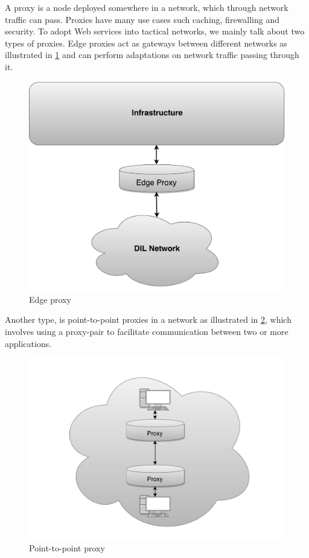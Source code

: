 A proxy is a node deployed somewhere in a network, which through network traffic
can pass. Proxies have many use cases such caching, firewalling and security. To
adopt Web services into tactical networks, we mainly talk about two types of
proxies. Edge proxies act as gateways between different networks as illustrated
in \cref{figure:edge} and can perform adaptations on network traffic passing
through it.

\begin{figure}[h]
\includegraphics[scale=0.35]{images/edge_proxy.pdf}
\caption{Edge proxy}
\label{figure:edge}
\end{figure}

Another type, is point-to-point proxies in a network as illustrated in
\cref{figure:proxy-point}, which involves using a proxy-pair to facilitate
communication between two or more applications.

\begin{figure}[h]
\includegraphics[scale=0.35]{images/proxy_point_gray.pdf}
\caption{Point-to-point proxy}
\label{figure:proxy-point}
\end{figure}

